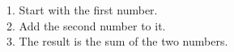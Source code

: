 \documentclass[preview]{standalone}
\begin{document}
\begin{center}
1. Start with the first number.\\2. Add the second number to it.\\3. The result is the sum of the two numbers.
\end{center}
\end{document}
